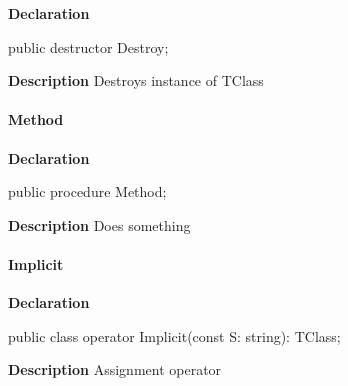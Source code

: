 \documentclass{report}
\begin{document}
\begin{list}{}{
\setlength{\itemindent}{0cm}
\setlength{\listparindent}{0cm}
\setlength{\leftmargin}{\evensidemargin}
\addtolength{\leftmargin}{\tmplength}
\settowidth{\labelsep}{X}
\addtolength{\leftmargin}{\labelsep}
\setlength{\labelwidth}{\tmplength}
}
\begin{flushleft}
\item[\textbf{Declaration}\hfill]
\begin{ttfamily}
public destructor Destroy;\end{ttfamily}


\end{flushleft}
\par
\item[\textbf{Description}]
Destroys instance of TClass

\end{list}
\paragraph*{Method}\hspace*{\fill}

\begin{list}{}{
\setlength{\itemindent}{0cm}
\setlength{\listparindent}{0cm}
\setlength{\leftmargin}{\evensidemargin}
\addtolength{\leftmargin}{\tmplength}
\settowidth{\labelsep}{X}
\addtolength{\leftmargin}{\labelsep}
\setlength{\labelwidth}{\tmplength}
}
\begin{flushleft}
\item[\textbf{Declaration}\hfill]
\begin{ttfamily}
public procedure Method;\end{ttfamily}


\end{flushleft}
\par
\item[\textbf{Description}]
Does something

\end{list}
\paragraph*{Implicit}\hspace*{\fill}

\begin{list}{}{
\setlength{\itemindent}{0cm}
\setlength{\listparindent}{0cm}
\setlength{\leftmargin}{\evensidemargin}
\addtolength{\leftmargin}{\tmplength}
\settowidth{\labelsep}{X}
\addtolength{\leftmargin}{\labelsep}
\setlength{\labelwidth}{\tmplength}
}
\begin{flushleft}
\item[\textbf{Declaration}\hfill]
\begin{ttfamily}
public class operator Implicit(const S: string): TClass;\end{ttfamily}


\end{flushleft}
\par
\item[\textbf{Description}]
Assignment operator

\end{list}
\end{document}
